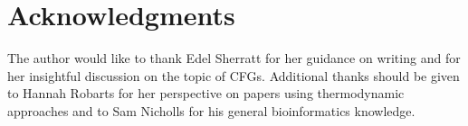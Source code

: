 \documentclass[journal]{IEEEtran}
\begin{document}
\appendices
%


\section*{Acknowledgments}
The author would like to thank Edel Sherratt for her guidance on writing and for her insightful discussion on the topic of CFGs. Additional thanks should be given to Hannah Robarts for her perspective on papers using thermodynamic approaches and to Sam Nicholls for his general bioinformatics knowledge.

\ifCLASSOPTIONcaptionsoff
  \newpage
\fi







%
%
%
\end{document}
